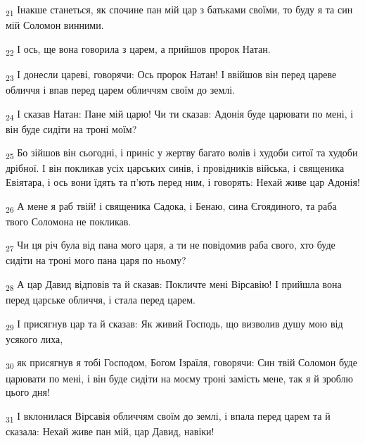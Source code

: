 \begin{tcolorbox}
\textsubscript{21} Інакше станеться, як спочине пан мій цар з батьками своїми, то буду я та син мій Соломон винними.
\end{tcolorbox}
\begin{tcolorbox}
\textsubscript{22} І ось, ще вона говорила з царем, а прийшов пророк Натан.
\end{tcolorbox}
\begin{tcolorbox}
\textsubscript{23} І донесли цареві, говорячи: Ось пророк Натан! І ввійшов він перед цареве обличчя і впав перед царем обличчям своїм до землі.
\end{tcolorbox}
\begin{tcolorbox}
\textsubscript{24} І сказав Натан: Пане мій царю! Чи ти сказав: Адонія буде царювати по мені, і він буде сидіти на троні моїм?
\end{tcolorbox}
\begin{tcolorbox}
\textsubscript{25} Бо зійшов він сьогодні, і приніс у жертву багато волів і худоби ситої та худоби дрібної. І він покликав усіх царських синів, і провідників війська, і священика Евіятара, і ось вони їдять та п'ють перед ним, і говорять: Нехай живе цар Адонія!
\end{tcolorbox}
\begin{tcolorbox}
\textsubscript{26} А мене я раб твій! і священика Садока, і Бенаю, сина Єгоядиного, та раба твого Соломона не покликав.
\end{tcolorbox}
\begin{tcolorbox}
\textsubscript{27} Чи ця річ була від пана мого царя, а ти не повідомив раба свого, хто буде сидіти на троні мого пана царя по ньому?
\end{tcolorbox}
\begin{tcolorbox}
\textsubscript{28} А цар Давид відповів та й сказав: Покличте мені Вірсавію! І прийшла вона перед царське обличчя, і стала перед царем.
\end{tcolorbox}
\begin{tcolorbox}
\textsubscript{29} І присягнув цар та й сказав: Як живий Господь, що визволив душу мою від усякого лиха,
\end{tcolorbox}
\begin{tcolorbox}
\textsubscript{30} як присягнув я тобі Господом, Богом Ізраїля, говорячи: Син твій Соломон буде царювати по мені, і він буде сидіти на моєму троні замість мене, так я й зроблю цього дня!
\end{tcolorbox}
\begin{tcolorbox}
\textsubscript{31} І вклонилася Вірсавія обличчям своїм до землі, і впала перед царем та й сказала: Нехай живе пан мій, цар Давид, навіки!
\end{tcolorbox}
